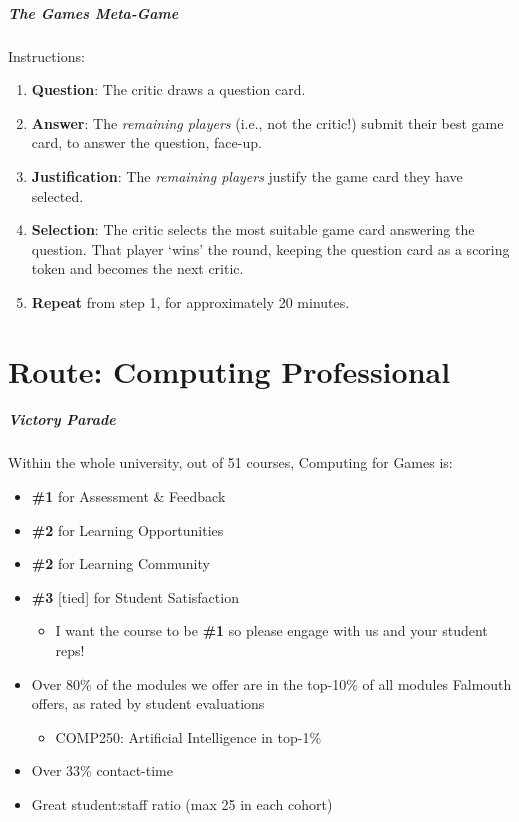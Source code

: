 \begin{frame}
	\frametitle{The Games Meta-Game}
	
	Instructions:
	
	\begin{enumerate}
		\item 	\textbf{Question}: The critic draws a question card. 
		\item 	\textbf{Answer}: The \textit{remaining players} (i.e., not the critic!) submit their best game card, to answer the question, face-up.
		\item 	\textbf{Justification}: The \textit{remaining players} justify the game card they have selected.
		\item 	\textbf{Selection}: The critic selects the most suitable game card answering the question. That player `wins' the round, keeping the question card as a scoring token
			and becomes the next critic.	
		\item 	\textbf{Repeat} from step 1, for approximately 20 minutes.	
	\end{enumerate}
\end{frame}
   
\part{Route: Computing Professional}
\frame{\partpage}

\begin{frame}
	\frametitle{Victory Parade}
	
	Within the whole university, out of 51 courses, Computing for Games is: \pause
	
	\begin{itemize}
		\item \textbf{\#1} for Assessment \& Feedback \pause
		\item \textbf{\#2} for Learning Opportunities \pause
		\item \textbf{\#2} for Learning Community \pause
		\item \textbf{\#3} [tied] for Student Satisfaction \pause
		\begin{itemize}
			\item I want the course to be \textbf{\#1} so please engage with us and your student reps! \pause
		\end{itemize}
		\item Over 80\% of the modules we offer are in the top-10\% of all modules Falmouth offers, as rated by student evaluations  \pause
		\begin{itemize}
			\item COMP250: Artificial Intelligence in top-1\% \pause
		\end{itemize}	
		\item Over 33\% contact-time \pause
		\item Great student:staff ratio (max 25 in each cohort) \pause
	\end{itemize}
\end{frame}

